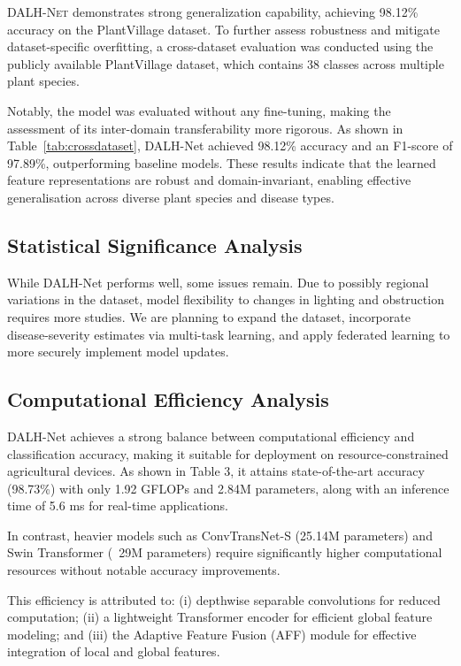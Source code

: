 \documentclass[default, iicol]{sn-jnl}
\theoremstyle{thmstyleone}%
\theoremstyle{thmstyletwo}%
\theoremstyle{thmstylethree}%
\newcommand{\dalh}{\textsc{DALH-Net}}
\begin{document}
\dalh{} demonstrates strong generalization capability, achieving 98.12\% accuracy on the PlantVillage dataset. To further assess robustness and mitigate dataset-specific overfitting, a cross-dataset evaluation was conducted using the publicly available PlantVillage dataset, which contains 38 classes across multiple plant species.

Notably, the model was evaluated without any fine-tuning, making the assessment of its inter-domain transferability more rigorous. As shown in Table~\ref{tab:crossdataset}, DALH-Net achieved 98.12\% accuracy and an F1-score of 97.89\%, outperforming baseline models. These results indicate that the learned feature representations are robust and domain-invariant, enabling effective generalisation across diverse plant species and disease types.

\subsection{Statistical Significance Analysis}

While DALH-Net performs well, some issues remain. Due to possibly regional variations in the dataset, model flexibility to changes in lighting and obstruction requires more studies. We are planning to expand the dataset, incorporate disease-severity estimates via multi-task learning, and apply federated learning to more securely implement model updates.


\subsection{Computational Efficiency Analysis}

DALH-Net achieves a strong balance between computational efficiency and classification accuracy, making it suitable for deployment on resource-constrained agricultural devices. As shown in Table 3, it attains state-of-the-art accuracy (98.73\%) with only 1.92 GFLOPs and 2.84M parameters, along with an inference time of 5.6 ms for real-time applications.

In contrast, heavier models such as ConvTransNet-S (25.14M parameters) and Swin Transformer (~29M parameters) require significantly higher computational resources without notable accuracy improvements.

This efficiency is attributed to: (i) depthwise separable convolutions for reduced computation; (ii) a lightweight Transformer encoder for efficient global feature modeling; and (iii) the Adaptive Feature Fusion (AFF) module for effective integration of local and global features.
\end{document}
